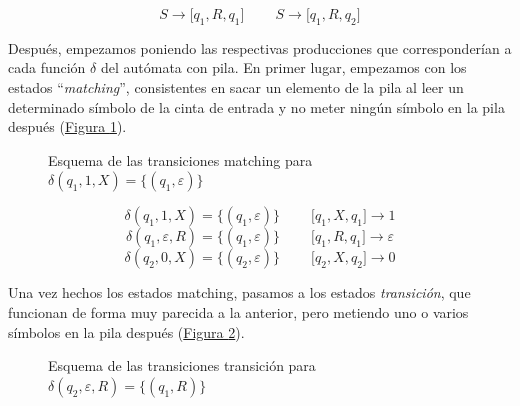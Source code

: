 \documentclass[10pt,a4paper,spanish]{report}
\begin{document}
\begin{displaymath}
  S \rightarrow \Big[q_1, R, q_1 \Big] \qquad\ S \rightarrow \Big[q_1, R, q_2 \Big]
\end{displaymath}

Después, empezamos poniendo las respectivas producciones que corresponderían a cada función $\delta$ del autómata con pila. En primer lugar, empezamos con los estados ``\textcolor{p4}{\textit{matching}}'', consistentes en sacar un elemento de la pila al leer un determinado símbolo de la cinta de entrada y no meter ningún símbolo en la pila después (\hyperref[matching]{Figura \ref*{matching}}).

\begin{figure}[!h]
  \centering
  
  \caption{Esquema de las transiciones matching para $\delta(q_1, 1, X) = \{(q_1, \varepsilon)\}$}
  \label{matching}
\end{figure}

\begin{displaymath}
  \delta(q_1, 1, X) = \{(q_1, \varepsilon)\} \qquad\ \Big[q_1, X, q_1\Big] \rightarrow 1
\end{displaymath}
\begin{displaymath}
  \delta(q_1, \varepsilon, R) = \{(q_1, \varepsilon)\} \qquad\ \Big[q_1, R, q_1\Big] \rightarrow \varepsilon
\end{displaymath}
\begin{displaymath}
  \delta(q_2, 0, X) = \{(q_2, \varepsilon)\} \qquad\ \Big[q_2, X, q_2\Big] \rightarrow 0
\end{displaymath}

Una vez hechos los estados matching, pasamos a los estados \textit{\textcolor{p4}{transición}}, que funcionan de forma muy parecida a la anterior, pero metiendo uno o varios símbolos en la pila después (\hyperref[transicion]{Figura \ref*{transicion}}).

\begin{figure}[!h]
  \centering
  
  \caption{Esquema de las transiciones transición para $\delta(q_2,\varepsilon,R) = \{(q_1,R)\}$}
  \label{transicion}
\end{figure}
\end{document}
